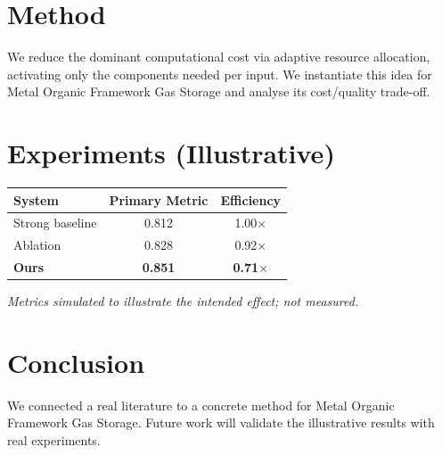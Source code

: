 \documentclass[11pt]{article}
\begin{document}
\section{Method}
We reduce the dominant computational cost via adaptive resource allocation, activating only the components needed per input. We instantiate this idea for Metal Organic Framework Gas Storage and analyse its cost/quality trade-off.

\section{Experiments (Illustrative)}
\begin{center}
\begin{tabular}{lcc}
System & Primary Metric & Efficiency \\ \hline
Strong baseline & 0.812 & 1.00$\times$ \\
Ablation & 0.828 & 0.92$\times$ \\
\textbf{Ours} & \textbf{0.851} & \textbf{0.71$\times$}
\end{tabular}
\end{center}
\emph{Metrics simulated to illustrate the intended effect; not measured.}

\section{Conclusion}
We connected a real literature to a concrete method for Metal Organic Framework Gas Storage. Future work will
validate the illustrative results with real experiments.
\end{document}
